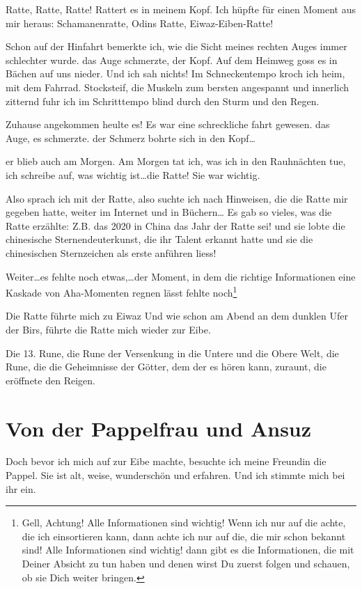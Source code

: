 \documentclass[11pt,titlepage,a5paper]{book}
\begin{document}
Ratte, Ratte, Ratte! Rattert es in meinem Kopf. Ich hüpfte für einen Moment aus mir heraus: Schamanenratte, Odins Ratte, Eiwaz-Eiben-Ratte!

Schon auf der Hinfahrt bemerkte ich, wie die Sicht meines rechten Auges immer schlechter wurde. das Auge schmerzte, der Kopf. Auf dem Heimweg goss es in Bächen auf uns nieder. Und ich sah nichts! Im Schneckentempo kroch ich heim, mit dem Fahrrad. Stocksteif, die Muskeln zum bersten angespannt und innerlich zitternd fuhr ich im Schritttempo blind durch den Sturm und den Regen.

Zuhause angekommen heulte es! Es war eine schreckliche fahrt gewesen. das Auge, es schmerzte. der Schmerz bohrte sich in den Kopf\dots

er blieb auch am Morgen. Am Morgen tat ich, was ich in den Rauhnächten tue, ich schreibe auf, was wichtig ist\dots die Ratte! Sie war wichtig.

Also sprach ich mit der Ratte, also suchte ich nach Hinweisen, die die Ratte mir gegeben hatte, weiter im Internet und in Büchern\dots
Es gab so vieles, was die Ratte erzählte: Z.B. das 2020 in China das Jahr der Ratte sei! und sie lobte die chinesische Sternendeuterkunst, die ihr Talent erkannt hatte und sie die chinesischen Sternzeichen als erste anführen liess!

Weiter\dots es fehlte noch etwas,\dots der Moment, in dem die richtige Informationen eine Kaskade von Aha-Momenten regnen lässt fehlte noch\footnote{Gell, Achtung! Alle Informationen sind wichtig! Wenn ich nur auf die achte, die ich einsortieren kann, dann achte ich nur auf die, die mir schon bekannt sind! Alle Informationen sind wichtig! dann gibt es die Informationen, die mit Deiner Absicht zu tun haben und denen wirst Du zuerst folgen und schauen, ob sie Dich weiter bringen.}

Die Ratte führte mich zu Eiwaz  Und wie schon am Abend an dem dunklen Ufer der Birs, führte die Ratte mich wieder zur Eibe. 

Die 13. Rune, die Rune der Versenkung in die Untere und die Obere Welt, die Rune, die die Geheimnisse der Götter, dem der es hören kann, zuraunt, die eröffnete den Reigen.

\section{Von der Pappelfrau und Ansuz  }

Doch bevor ich mich auf zur Eibe machte, besuchte ich meine Freundin die Pappel. Sie ist alt, weise, wunderschön und erfahren. Und ich stimmte mich bei ihr ein.
\end{document}
